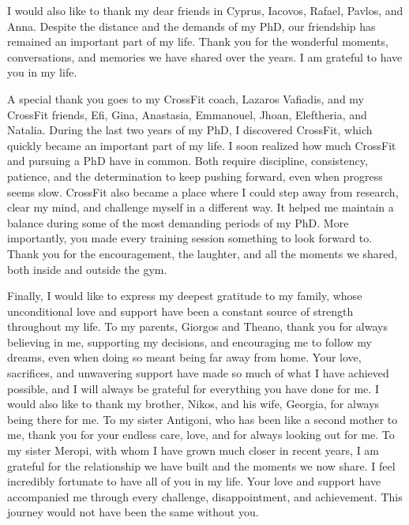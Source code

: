 I would also like to thank my dear friends in Cyprus, Iacovos, Rafael, Pavlos, and Anna.
Despite the distance and the demands of my PhD, our friendship has remained an important part of my life.
Thank you for the wonderful moments, conversations, and memories we have shared over the years.
I am grateful to have you in my life.

A special thank you goes to my CrossFit coach, Lazaros Vafiadis, and my CrossFit friends, Efi, Gina, Anastasia, Emmanouel, Jhoan, Eleftheria, and Natalia.
During the last two years of my PhD, I discovered CrossFit, which quickly became an important part of my life.
I soon realized how much CrossFit and pursuing a PhD have in common.
Both require discipline, consistency, patience, and the determination to keep pushing forward, even when progress seems slow.
CrossFit also became a place where I could step away from research, clear my mind, and challenge myself in a different way.
It helped me maintain a balance during some of the most demanding periods of my PhD.
More importantly, you made every training session something to look forward to.
Thank you for the encouragement, the laughter, and all the moments we shared, both inside and outside the gym.

Finally, I would like to express my deepest gratitude to my family, whose unconditional love and support have been a constant source of strength throughout my life.
To my parents, Giorgos and Theano, thank you for always believing in me, supporting my decisions, and encouraging me to follow my dreams, even when doing so meant being far away from home.
Your love, sacrifices, and unwavering support have made so much of what I have achieved possible, and I will always be grateful for everything you have done for me.
I would also like to thank my brother, Nikos, and his wife, Georgia, for always being there for me.
To my sister Antigoni, who has been like a second mother to me, thank you for your endless care, love, and for always looking out for me.
To my sister Meropi, with whom I have grown much closer in recent years, I am grateful for the relationship we have built and the moments we now share.
I feel incredibly fortunate to have all of you in my life.
Your love and support have accompanied me through every challenge, disappointment, and achievement.
This journey would not have been the same without you.
